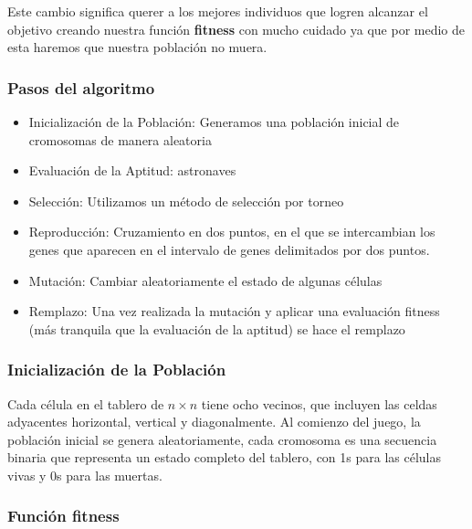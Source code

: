 Este cambio significa querer a los mejores individuos que logren alcanzar el objetivo creando 
nuestra función \textbf{fitness} con mucho cuidado ya que por medio de esta haremos que 
nuestra población no muera.\\ 

\subsubsection*{Pasos del algoritmo}

\begin{itemize}
    \item Inicialización de la Población: Generamos una población inicial de cromosomas de 
    manera aleatoria
    \item Evaluación de la Aptitud: astronaves
    \item Selección: Utilizamos un método de selección por torneo
    \item Reproducción: Cruzamiento en dos puntos, en el que se intercambian los genes que 
    aparecen en el intervalo de genes delimitados por dos puntos.
    \item Mutación: Cambiar aleatoriamente el estado de algunas células
    \item Remplazo: Una vez realizada la mutación y aplicar una evaluación fitness (más 
    tranquila que la evaluación de la aptitud) se hace el remplazo
\end{itemize}


\subsubsection*{Inicialización de la Población}

Cada célula en el tablero de $n \times n$ tiene ocho vecinos, que incluyen las celdas 
adyacentes horizontal, vertical y diagonalmente. Al comienzo del juego, la población inicial 
se genera aleatoriamente, cada cromosoma es una secuencia binaria que representa un estado 
completo del tablero, con 1s para las células vivas y 0s para las muertas.

\subsubsection*{Función fitness}

